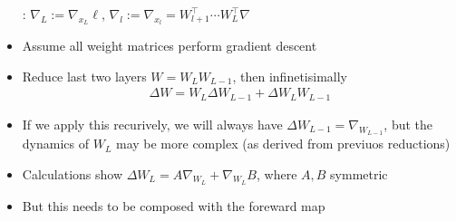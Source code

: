 \documentclass{article}
\begin{document}
\begin{itemize}
: $\nabla_L := \nabla_{x_L} \ell$, $\nabla_l := \nabla_{x_l} = W^\top_{l+1} \cdots W^\top_L \nabla$ 
\item Assume all weight matrices perform gradient descent 
\item Reduce last two layers $W = W_L W_{L-1}$, then infinetisimally 
\begin{align}
\Delta W = W_L \Delta W_{L-1} + \Delta W_L W_{L-1} 
\end{align}
\item If we apply this recurively, we will always have $\Delta W_{L-1} = \nabla_{W_{L-1}}$, but the dynamics of $W_L$ may be more complex (as derived from previuos reductions)
\item Calculations show $\Delta W_L = A \nabla_{W_L} + \nabla_{W_L} B$, where $A,B$ symmetric
\item But this needs to be composed with the foreward map 
\end{itemize}


 
\end{document}
